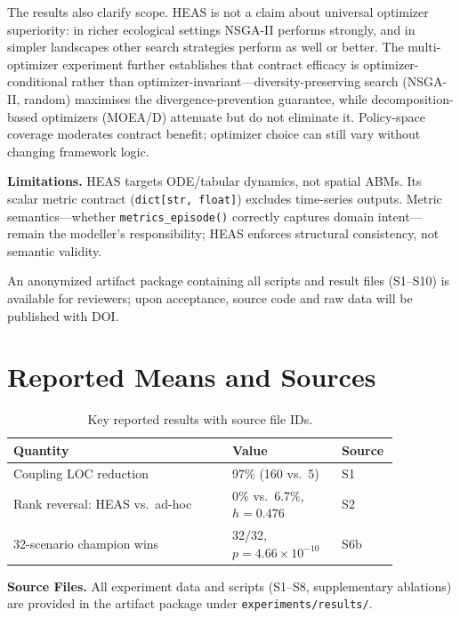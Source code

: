 \documentclass{wscpaperproc}
\begin{document}
The results also clarify scope. HEAS is not a claim about universal optimizer
superiority: in richer ecological settings NSGA-II performs strongly, and in
simpler landscapes other search strategies perform as well or better. The
multi-optimizer experiment further establishes that contract efficacy is
optimizer-conditional rather than optimizer-invariant---diversity-preserving
search (NSGA-II, random) maximises the divergence-prevention guarantee, while
decomposition-based optimizers (MOEA/D) attenuate but do not eliminate it.
Policy-space coverage moderates contract benefit; optimizer choice can still
vary without changing framework logic.

\textbf{Limitations.} HEAS targets ODE/tabular dynamics, not spatial ABMs. Its
scalar metric contract (\texttt{dict[str, float]}) excludes time-series outputs.
Metric semantics---whether \texttt{metrics\_episode()} correctly captures domain
intent---remain the modeller's responsibility; HEAS enforces structural
consistency, not semantic validity.

An anonymized artifact package containing all scripts and result files (S1--S10)
is available for reviewers; upon acceptance, source code and raw data will be
published with DOI.

\appendix
\section{Reported Means and Sources}

\begin{table}[ht]
\caption{Key reported results with source file IDs.}
\label{tab:appendix-results}
\centering\small
\begin{tabular}{p{0.52\linewidth}p{0.26\linewidth}p{0.08\linewidth}}
\toprule
Quantity & Value & Source \\
\midrule
Coupling LOC reduction & 97\% (160 vs.\ 5) & S1 \\
Rank reversal: HEAS vs.\ ad-hoc & 0\% vs.\ 6.7\%, $h\!=\!0.476$ & S2 \\
32-scenario champion wins & 32/32, $p\!=\!4.66\!\times\!10^{-10}$ & S6b \\
\bottomrule
\end{tabular}
\end{table}

\noindent\textbf{Source Files.} All experiment data and scripts (S1--S8, supplementary ablations)
are provided in the artifact package under \texttt{experiments/results/}.
\end{document}
